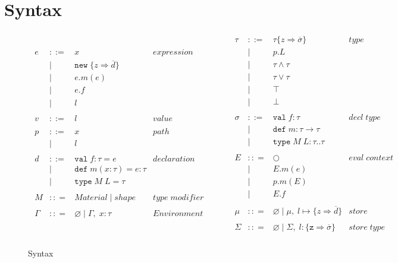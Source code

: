\documentclass{llncs}
\numberwithin{subcase}{casethm}
\numberwithin{casethm}{theorem}
\numberwithin{casethm}{lemma}
\begin{document}
\section{Syntax}

\begin{figure}[h]
\[
\begin{array}{lll}
\begin{array}{lllr}
e & ::= & x & expression \\
& | & \texttt{new} \; \{z \Rightarrow \overline{d}\}&\\
& | & e.m(e) &\\
& | & e.f &\\
& | & l &\\
&&\\
v & ::= & l & value \\
&&\\
p & ::= & x & path \\
  & |   & l &\\
&&\\
d & ::= & \texttt{val} \; f : \tau = e & declaration \\
  & |   & \texttt{def} \; m(x:\tau) = e : \tau &\\
  & |   & \texttt{type} \; M \; L = \tau&\\
&&\\
M & :: = & Material \; | \; shape &  type \; modifier \\
&&\\
\Gamma & :: = & \varnothing \; | \; \Gamma,\; x : \tau & Environment \\
 \end{array}
& ~~~~~~
&
\begin{array}{lllr}
\tau & ::= & \tau\{z \Rightarrow \overline{\sigma}\} & type \\
& | & p.L \\
& | & \tau \wedge \tau & \\
& | & \tau \vee \tau & \\
& | & \top \\
& | & \bot \\
&&\\
\sigma & ::= & \texttt{val} \; f:\tau & decl \; type\\
       & |   & \texttt{def} \; m:\tau \rightarrow \tau \\
		 & |   & \texttt{type} \; M \; L : \tau .. \tau &\\
&&\\
E & :: = & \bigcirc & eval \; context\\
       & | & E.m(e)\\
       & | & p.m(E)\\
       & | & E.f\\
&&\\
\mu & :: = & \varnothing \; | \; \mu,\; l \mapsto \{z \Rightarrow \overline{d}\} & store \\
&&\\
\Sigma & :: = & \varnothing \; | \; \Sigma,\; l : \{\texttt{z} \Rightarrow \overline{\sigma}\} & store \; type \\
\end{array}
\end{array}
\]
\caption{Syntax}
\label{f:syntax}
\end{figure}
\end{document}
